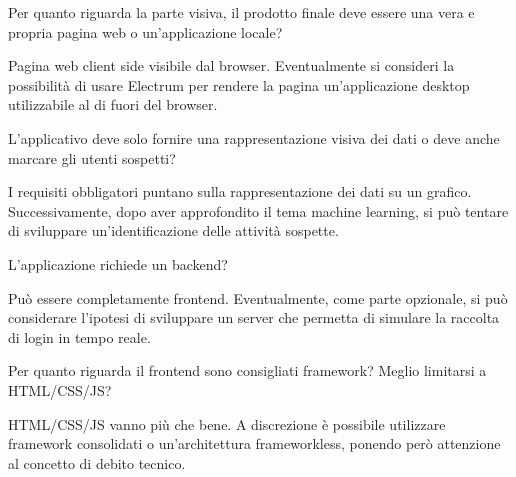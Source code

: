\begin{minipage}[c]{0.47\textwidth}
\centering
Per quanto riguarda la parte visiva, il prodotto finale deve essere una vera e propria pagina web o un’applicazione locale?
\end{minipage}
\hfill
\begin{minipage}[c]{0.47\textwidth}
\centering
Pagina web client side visibile dal browser. Eventualmente si consideri la possibilità di usare Electrum per rendere la pagina un’applicazione desktop utilizzabile al di fuori del browser.
\end{minipage}

\begin{spacing}{3}
\end{spacing}

\begin{minipage}[c]{0.47\textwidth}
\centering
L’applicativo deve solo fornire una rappresentazione visiva dei dati o deve anche marcare gli utenti sospetti?
\end{minipage}
\hfill
\begin{minipage}[c]{0.47\textwidth}
\centering
I requisiti obbligatori puntano sulla rappresentazione dei dati su un grafico. Successivamente, dopo aver approfondito il tema machine learning, si può tentare di sviluppare un’identificazione delle attività sospette.
\end{minipage}

\begin{spacing}{3}
\end{spacing}

\begin{minipage}[c]{0.47\textwidth}
\centering
L’applicazione richiede un backend?
\end{minipage}
\hfill
\begin{minipage}[c]{0.47\textwidth}
\centering
Può essere completamente frontend. Eventualmente, come parte opzionale, si può considerare l’ipotesi di sviluppare un server che permetta di simulare la raccolta di login in tempo reale.
\end{minipage}

\begin{spacing}{3}
\end{spacing}

\begin{minipage}[c]{0.47\textwidth}
\centering
Per quanto riguarda il frontend sono consigliati framework? Meglio limitarsi a HTML/CSS/JS?
\end{minipage}
\hfill
\begin{minipage}[c]{0.47\textwidth}
\centering
HTML/CSS/JS vanno più che bene. A discrezione è possibile utilizzare framework consolidati o un’architettura frameworkless, ponendo però attenzione al concetto di debito tecnico.
\end{minipage}

